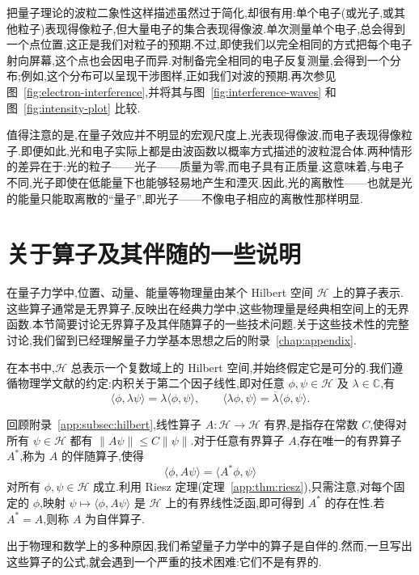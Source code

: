 把量子理论的波粒二象性这样描述虽然过于简化,却很有用:单个电子(或光子,或其他粒子)表现得像粒子,但大量电子的集合表现得像波.单次测量单个电子,总会得到一个点位置,这正是我们对粒子的预期.不过,即使我们以完全相同的方式把每个电子射向屏幕,这个点也会因电子而异.对制备完全相同的电子反复测量,会得到一个分布;例如,这个分布可以呈现干涉图样,正如我们对波的预期.再次参见图~\ref{fig:electron-interference},并将其与图~\ref{fig:interference-waves} 和图~\ref{fig:intensity-plot} 比较.

值得注意的是,在量子效应并不明显的宏观尺度上,光表现得像波,而电子表现得像粒子.即便如此,光和电子实际上都是由波函数以概率方式描述的波粒混合体.两种情形的差异在于:光的粒子——光子——质量为零,而电子具有正质量.这意味着,与电子不同,光子即使在低能量下也能够轻易地产生和湮灭.因此,光的离散性——也就是光的能量只能取离散的“量子”,即光子——不像电子相应的离散性那样明显.

\section{关于算子及其伴随的一些说明}\label{sec:operators-adjoints}

在量子力学中,位置、动量、能量等物理量由某个 Hilbert 空间 \(\mathcal{H}\) 上的算子表示.这些算子通常是无界算子,反映出在经典力学中,这些物理量是经典相空间上的无界函数.本节简要讨论无界算子及其伴随算子的一些技术问题.关于这些技术性的完整讨论,我们留到已经理解量子力学基本思想之后的附录~\ref{chap:appendix}.

在本书中,\(\mathcal{H}\) 总表示一个复数域上的 Hilbert 空间,并始终假定它是可分的.我们遵循物理学文献的约定:内积关于第二个因子线性,即对任意 \(\phi,\psi\in\mathcal{H}\) 及 \(\lambda\in\mathbb{C}\),有
\[
\langle\phi,\lambda\psi\rangle=\lambda\langle\phi,\psi\rangle,
\qquad
\langle\lambda\phi,\psi\rangle=\overline{\lambda}\langle\phi,\psi\rangle.
\]

回顾附录~\ref{app:subsec:hilbert},线性算子 \(A:\mathcal{H}\to\mathcal{H}\) 有界,是指存在常数 \(C\),使得对所有 \(\psi\in\mathcal{H}\) 都有 \(\|A\psi\|\le C\|\psi\|\).对于任意有界算子 \(A\),存在唯一的有界算子 \(A^{*}\),称为 \(A\) 的伴随算子,使得
\[
\langle\phi,A\psi\rangle=\langle A^{*}\phi,\psi\rangle
\]
对所有 \(\phi,\psi\in\mathcal{H}\) 成立.利用 Riesz 定理(定理~\ref{app:thm:riesz}),只需注意,对每个固定的 \(\phi\),映射 \(\psi\mapsto\langle\phi,A\psi\rangle\) 是 \(\mathcal{H}\) 上的有界线性泛函,即可得到 \(A^{*}\) 的存在性.若 \(A^{*}=A\),则称 \(A\) 为自伴算子.

出于物理和数学上的多种原因,我们希望量子力学中的算子是自伴的.然而,一旦写出这些算子的公式,就会遇到一个严重的技术困难:它们不是有界的.

